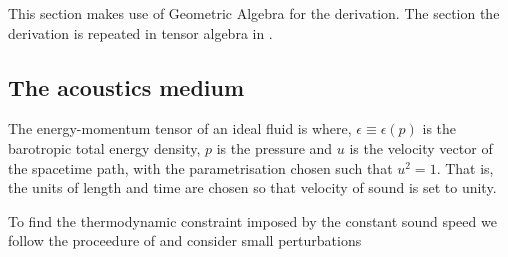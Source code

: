This section makes use of Geometric Algebra\cite{Hestenes1984,Doran2003} for the derivation.
The section the derivation is repeated in tensor algebra in .

\subsection{The acoustics medium}\label{sec:MaxwellAnalogue}

The energy-momentum tensor of an ideal fluid is\cite{LandauBook, Taub1978}
where, $\epsilon \equiv \epsilon(p)$ is the barotropic total energy density,
$p$ is the pressure
and 
$u$ is the velocity vector of the spacetime path, with the parametrisation chosen such that $u^2 =  1$. %
That is, the units of length and time are chosen so that velocity of sound is set to unity.

To find the thermodynamic constraint imposed by the constant sound speed we follow the proceedure of 
and consider small perturbations

